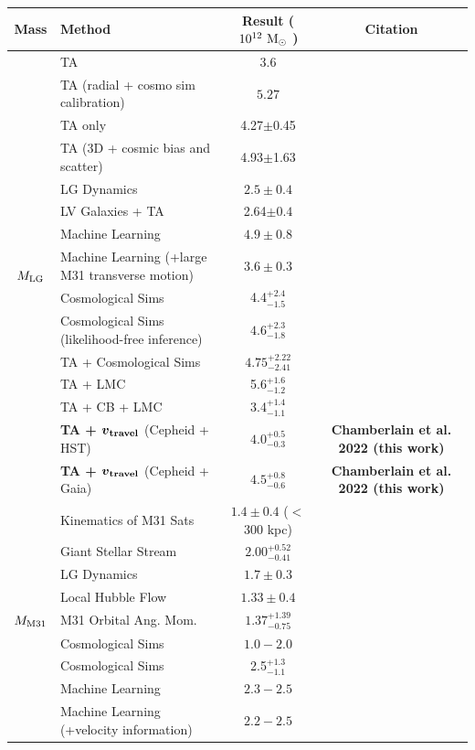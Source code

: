 \documentclass[twocolumn]{aastex631}
\newcommand{\mlg}{\ensuremath{M_{\rm LG}}}
\newcommand{\mmto}{\ensuremath{M_{\rm M31}}}
\newcommand{\bov}{\ensuremath{\boldsymbol{v}}}
\newcommand{\vtrav}{\ensuremath{\bov_{\rm travel}}}
\begin{document}
\begin{table}
  \centering
  \begin{tabular}{clc|c}
    \hline\hline
    Mass & Method & Result ($ 10^{12}~\mathrm{M}_\odot$ ) & Citation \\\hline
    \multirow{15}{*}{\mlg}  & TA & $3.6$ & \citealt{Lynden-Bell:1981} \\
    &TA (radial + cosmo sim calibration)  & $5.27$& \citealt{LiWhite2008} \\
    &{TA only} & {4.27$\pm$0.45} & \citealt{vdm2012} \\
    &{TA (3D + cosmic bias and scatter)} & {4.93$\pm$1.63} &\citealt{vdm2012}\\
    & LG Dynamics &$2.5\pm0.4$ & \citealt{Diaz2014}\\
    &{LV Galaxies + TA} & {2.64$\pm0.4$} & \citealt{Penarrubia2016} \\
    & Machine Learning & $4.9 \pm 0.8$ & \citealt{McLeod2017}\\
    & Machine Learning (+large M31 transverse motion) & $3.6\pm0.3$ &
    \citealt{McLeod2017}\\
    & Cosmological Sims & 4.4$^{+2.4}_{-1.5}$ & \citealt{Zhai2020}\\
    & Cosmological Sims (likelihood-free inference) & $4.6^{+2.3}_{-1.8}$ &
    \citealt{Lemos2021}\\
    & TA + Cosmological Sims & $4.75^{+2.22}_{-2.41}$ & \citealt{Hartl2021}\\
    & TA + LMC & 5.6$^{+1.6}_{-1.2}$ & \citealt{Benisty2022}\\
    & TA + CB + LMC & 3.4$^{+1.4}_{-1.1}$ & \citealt{Benisty2022}\\
    & \textbf{TA + $\boldsymbol{\vtrav}$} (Cepheid + HST) & {$\boldsymbol{4.0^{+0.5}_{-0.3}}$}&
    \textbf{Chamberlain et al. 2022 (this work)}\\
    & \textbf{TA + $\boldsymbol{\vtrav}$} (Cepheid + Gaia) & {$\boldsymbol{4.5^{+0.8}_{-0.6}}$}&
    \textbf{Chamberlain et al. 2022 (this work)}\\
    \hline
    \multirow{9}{*}{\mmto}& Kinematics of M31 Sats & $1.4 \pm 0.4$ ($<$300 kpc)
    & \citealt{Watkins2010}\\
    & Giant Stellar Stream & $2.00^{+0.52}_{-0.41}$ & \citealt{Fardal2013}\\
    & LG Dynamics &$1.7\pm0.3$ & \citealt{Diaz2014}\\
    & Local Hubble Flow &  $1.33\pm0.4$ & \citealt{Penarrubia2016}\\
    & M31 Orbital Ang. Mom. & $1.37^{+1.39}_{-0.75}$ & \citealt{Patel2017b}\\
    & Cosmological Sims & $1.0-2.0$ & \citealt{Carlesi2017} \\
    & Cosmological Sims & 2.5$^{+1.3}_{-1.1}$ & \citealt{Zhai2020}\\
    & Machine Learning & $2.3-2.5$& \citealt{Villanueva-Domingo2021}\\
    & Machine Learning (+velocity information) & $2.2-2.5$ &
    \citealt{Villanueva-Domingo2021}\\


\end{tabular}
\end{table}
\end{document}

